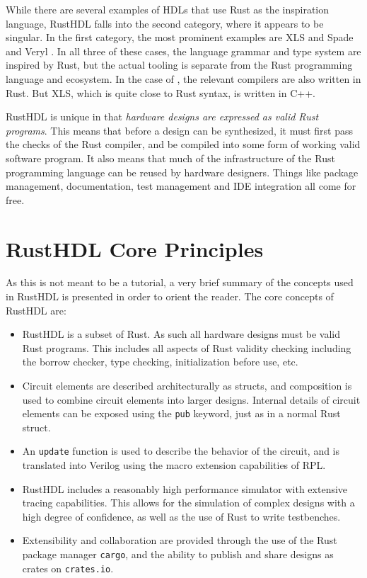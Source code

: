 \documentclass[conference]{IEEEtran}
\begin{document}
While there are several examples of HDLs that use Rust as the inspiration language, RustHDL falls 
into the second category, where it appears to be singular.  In the 
first category, the most prominent examples are XLS \cite{b4} and Spade \cite{b1} and Veryl \cite{b5}.  
In all three of these cases, the language grammar and type system are inspired by Rust, but 
the actual tooling is separate from the Rust programming language and ecosystem.  In the case of 
\cite{b1, b5}, the relevant compilers are also written in Rust.  But XLS, which is quite close to 
Rust syntax, is written in C++.

RustHDL is unique in that \emph{hardware designs are expressed as valid Rust programs}.
This means that before a design can be synthesized, it must first pass the checks of the Rust
compiler, and be compiled into some form of working valid software program.
It also means that much of the infrastructure of the Rust programming language can be reused
by hardware designers.  Things like package management, documentation, test management and IDE 
integration all come for free.

\section{RustHDL Core Principles}\label{sec:core}

As this is not meant to be a tutorial, a very brief summary of the concepts used in RustHDL is presented
in order to orient the reader.  The core concepts of RustHDL are:

\begin{itemize}
  \item RustHDL is a subset of Rust.  As such all hardware designs must be valid Rust programs.  This includes
  all aspects of Rust validity checking including the borrow checker, type checking, initialization before 
  use, etc.
  \item Circuit elements are described architecturally as structs, and composition is used to combine 
  circuit elements into larger designs. Internal details of circuit elements can be exposed using the 
  \verb|pub| keyword, just as in a normal Rust struct.
  \item An \verb|update| function is used to describe the behavior of the circuit, and is 
  translated into Verilog using the macro extension capabilities of RPL.
  \item RustHDL includes a reasonably high performance simulator with extensive tracing capabilities.
  This allows for the simulation of complex designs with a high degree of confidence, as well as 
  the use of Rust to write testbenches.
  \item Extensibility and collaboration are provided through the use of the Rust package manager \verb|cargo|, and 
  the ability to publish and share designs as crates on \verb|crates.io|.
\end{itemize}
\end{document}
